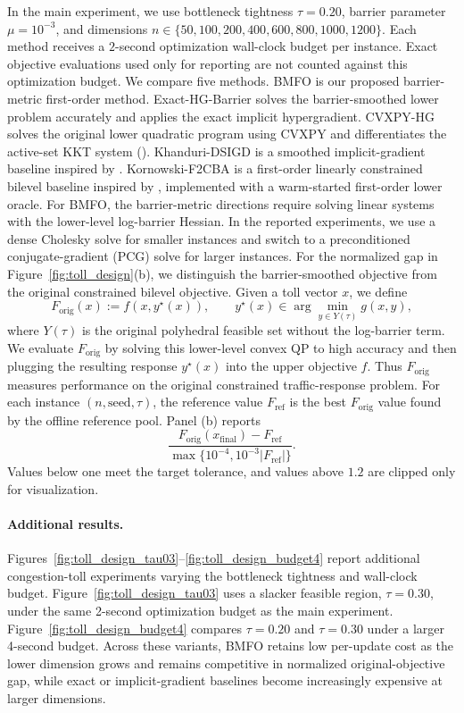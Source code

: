 \documentclass{article}
\begin{document}
In the main experiment, we use bottleneck tightness \(\tau=0.20\), barrier parameter
\(\mu=10^{-3}\), and dimensions
\(
n\in\{50,100,200,400,600,800,1000,1200\}.\) Each method receives a \(2\)-second optimization wall-clock budget per
instance. Exact objective evaluations used only for reporting are not counted against this optimization
budget. We compare five methods. BMFO is our proposed barrier-metric first-order method.
Exact-HG-Barrier solves the barrier-smoothed lower problem accurately and applies the exact implicit
hypergradient. CVXPY-HG solves the original lower quadratic program using CVXPY and
differentiates the active-set KKT system (\cite{agrawal2019differentiable}). Khanduri-DSIGD is a smoothed implicit-gradient baseline
inspired by \citet{khanduri2023linearly}. Kornowski-F2CBA is a first-order linearly constrained
bilevel baseline inspired by \citet{kornowski2024first}, implemented with a warm-started first-order
lower oracle.  For BMFO, the barrier-metric directions require solving linear systems with the
lower-level log-barrier Hessian. In the reported experiments, we use a dense
Cholesky solve for smaller instances and switch to a preconditioned
conjugate-gradient (PCG) solve for larger instances. For the normalized gap in Figure~\ref{fig:toll_design}(b), we distinguish the barrier-smoothed objective from the original
constrained bilevel objective. Given a toll vector \(x\), we define
\[
F_{\mathrm{orig}}(x) := f(x,y^\star(x)),\qquad
y^\star(x)\in\arg\min_{y\in Y(\tau)} g(x,y),
\]
where \(Y(\tau)\) is the original polyhedral feasible set without the log-barrier
term. We evaluate \(F_{\mathrm{orig}}\) by solving this lower-level convex QP to
high accuracy and then plugging the resulting response \(y^\star(x)\) into the
upper objective \(f\). Thus \(F_{\mathrm{orig}}\) measures performance on the
original constrained traffic-response problem. For each instance \((n,\mathrm{seed},\tau)\), the reference value
\(F_{\mathrm{ref}}\) is the best \(F_{\mathrm{orig}}\) value found by the offline
reference pool. Panel (b) reports
\[
\frac{F_{\mathrm{orig}}(x_{\mathrm{final}})-F_{\mathrm{ref}}}
{\max\{10^{-4},10^{-3}|F_{\mathrm{ref}}|\}}.
\]
Values below one meet the target tolerance, and values above \(1.2\) are clipped
only for visualization.


\paragraph{Additional results.}
Figures~\ref{fig:toll_design_tau03}--\ref{fig:toll_design_budget4} report additional congestion-toll
experiments varying the bottleneck tightness and wall-clock budget. Figure~\ref{fig:toll_design_tau03}
uses a slacker feasible region, \(\tau=0.30\), under the same 2-second optimization budget as the main
experiment. Figure~\ref{fig:toll_design_budget4} compares \(\tau=0.20\) and \(\tau=0.30\) under a
larger 4-second budget. Across these variants, BMFO retains low per-update cost as the lower
dimension grows and remains competitive in normalized original-objective gap, while exact or
implicit-gradient baselines become increasingly expensive at larger dimensions.
\end{document}
